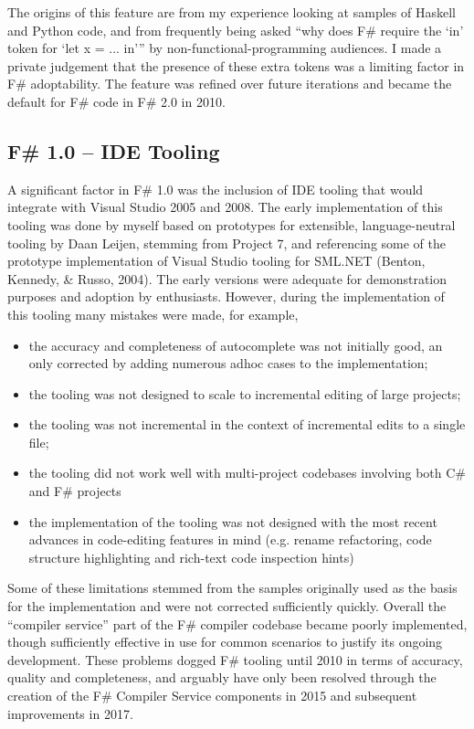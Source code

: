 \documentclass[acmsmall,review]{acmart}\settopmatter{printfolios=true,printccs=false,printacmref=false}
\begin{document}
The origins of this feature are from my experience looking at samples of Haskell and Python code, and from frequently being asked “why does F\# require the ‘in’ token for ‘let x = ... in’” by non-functional-programming audiences.  I made a private judgement that the presence of these extra tokens was a limiting factor in F\# adoptability.  The feature was refined over future iterations and became the default for F\# code in F\# 2.0 in 2010.

\subsection*{F\# 1.0 – IDE Tooling}

A significant factor in F\# 1.0 was the inclusion of IDE tooling that would integrate with Visual Studio 2005 and 2008. The early implementation of this tooling was done by myself based on prototypes for extensible, language-neutral tooling by Daan Leijen, stemming from Project 7, and referencing some of the prototype implementation of Visual Studio tooling for SML.NET (Benton, Kennedy, \& Russo, 2004). The early versions were adequate for demonstration purposes and adoption by enthusiasts.  However, during the implementation of this tooling many mistakes were made, for example, 

\begin{itemize}
\item the accuracy and completeness of autocomplete was not initially good, an only corrected by adding numerous adhoc cases to the implementation;
\item the tooling was not designed to scale to incremental editing of large projects;
\item the tooling was not incremental in the context of incremental edits to a single file;
\item the tooling did not work well with multi-project codebases involving both C\# and F\# projects
\item the implementation of the tooling was not designed with the most recent advances in code-editing features in mind (e.g. rename refactoring, code structure highlighting and rich-text code inspection hints) 
\end{itemize}

Some of these limitations stemmed from the samples originally used as the basis for the implementation and were not corrected sufficiently quickly.  Overall the “compiler service” part of the F\# compiler codebase became poorly implemented, though sufficiently effective in use for common scenarios to justify its ongoing development.  These problems dogged F\# tooling until 2010 in terms of accuracy, quality and completeness, and arguably have only been resolved through the creation of the F\# Compiler Service components in 2015 and subsequent improvements in 2017.  
\end{document}
